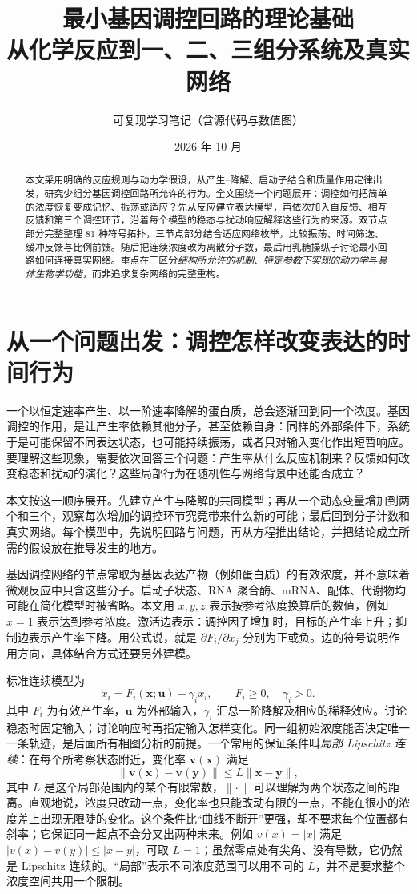\documentclass[11pt,a4paper,UTF8,fontset=fandol]{ctexart}
\title{\bfseries 最小基因调控回路的理论基础\\[4pt]\large 从化学反应到一、二、三组分系统及真实网络}
\author{可复现学习笔记（含源代码与数值图）}
\date{2026 年 10 月}
\begin{document}
\maketitle
\begin{abstract}
本文采用明确的反应规则与动力学假设，从产生--降解、启动子结合和质量作用定律出发，研究少组分基因调控回路所允许的行为。全文围绕一个问题展开：调控如何把简单的浓度恢复变成记忆、振荡或适应？先从反应建立表达模型，再依次加入自反馈、相互反馈和第三个调控环节，沿着每个模型的稳态与扰动响应解释这些行为的来源。双节点部分完整整理 81 种符号拓扑，三节点部分结合适应网络枚举，比较振荡、时间筛选、缓冲反馈与比例前馈。随后把连续浓度改为离散分子数，最后用乳糖操纵子讨论最小回路如何连接真实网络。重点在于区分\emph{结构所允许的机制}、\emph{特定参数下实现的动力学}与\emph{具体生物学功能}，而非追求复杂网络的完整重构。
\end{abstract}
\newpage{\small\linespread{.93}\selectfont\setlength{\parskip}{0pt}\tableofcontents}\newpage
\section{从一个问题出发：调控怎样改变表达的时间行为}
一个以恒定速率产生、以一阶速率降解的蛋白质，总会逐渐回到同一个浓度。基因调控的作用，是让产生率依赖其他分子，甚至依赖自身：同样的外部条件下，系统于是可能保留不同表达状态，也可能持续振荡，或者只对输入变化作出短暂响应。要理解这些现象，需要依次回答三个问题：产生率从什么反应机制来？反馈如何改变稳态和扰动的演化？这些局部行为在随机性与网络背景中还能否成立？

本文按这一顺序展开。先建立产生与降解的共同模型；再从一个动态变量增加到两个和三个，观察每次增加的调控环节究竟带来什么新的可能；最后回到分子计数和真实网络。每个模型中，先说明回路与问题，再从方程推出结论，并把结论成立所需的假设放在推导发生的地方。

基因调控网络的节点常取为基因表达产物（例如蛋白质）的有效浓度，并不意味着微观反应中只含这些分子。启动子状态、RNA 聚合酶、mRNA、配体、代谢物均可能在简化模型时被省略。本文用 $x,y,z$ 表示按参考浓度换算后的数值，例如 $x=1$ 表示达到参考浓度。激活边表示：调控因子增加时，目标的产生率上升；抑制边表示产生率下降。用公式说，就是 $\partial F_i/\partial x_j$ 分别为正或负。边的符号说明作用方向，具体结合方式还要另外建模。

标准连续模型为
\begin{equation}\dot x_i=F_i(\bm{x};\bm{u})-\gamma_i x_i,\qquad F_i\geq0,\quad\gamma_i>0.\end{equation}
其中 $F_i$ 为有效产生率，$\bm u$ 为外部输入，$\gamma_i$ 汇总一阶降解及相应的稀释效应。讨论稳态时固定输入；讨论响应时再指定输入怎样变化。同一组初始浓度能否决定唯一一条轨迹，是后面所有相图分析的前提。一个常用的保证条件叫\emph{局部 Lipschitz 连续}：在每个所考察状态附近，变化率 $\bm v(\bm x)$ 满足
\[
\|\bm v(\bm x)-\bm v(\bm y)\|\leq L\|\bm x-\bm y\|,
\]
其中 $L$ 是这个局部范围内的某个有限常数，$\|\cdot\|$ 可以理解为两个状态之间的距离。直观地说，浓度只改动一点，变化率也只能改动有限的一点，不能在很小的浓度差上出现无限陡的变化。这个条件比“曲线不断开”更强，却不要求每个位置都有斜率；它保证同一起点不会分叉出两种未来。例如 $v(x)=|x|$ 满足 $|v(x)-v(y)|\leq|x-y|$，可取 $L=1$；虽然零点处有尖角、没有导数，它仍然是 Lipschitz 连续的。“局部”表示不同浓度范围可以用不同的 $L$，并不是要求整个浓度空间共用一个限制。
\end{document}

